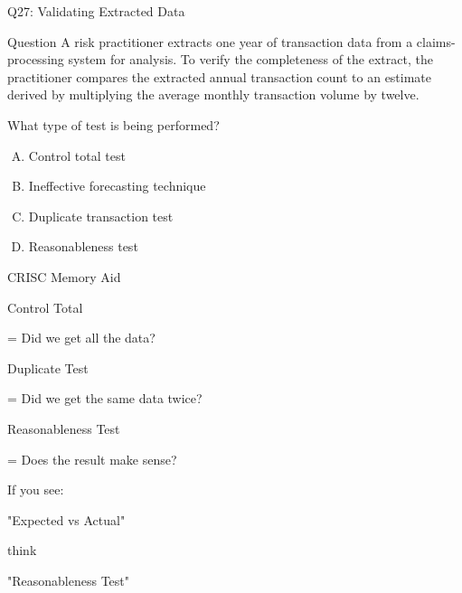 \documentclass{beamer}
\begin{document}
	
	\begin{frame}{Q27: Validating Extracted Data}
		\begin{block}{Question}
			A risk practitioner extracts one year of transaction data from a
			claims-processing system for analysis. To verify the completeness
			of the extract, the practitioner compares the extracted annual
			transaction count to an estimate derived by multiplying the
			average monthly transaction volume by twelve.
			
			What type of test is being performed?
		\end{block}
		
		\begin{enumerate}[(A)]
			\item Control total test
			\item Ineffective forecasting technique
			\item Duplicate transaction test
			\item Reasonableness test
		\end{enumerate}
		
			
		\begin{block}{CRISC Memory Aid}
			
			Control Total
			
			= Did we get all the data?
			
			\vspace{0.1cm}
			
			Duplicate Test
			
			= Did we get the same data twice?
			
			\vspace{0.1cm}
			
			Reasonableness Test
			
			= Does the result make sense?
			
			\vspace{0.15cm}
			
			If you see:
			
			"Expected vs Actual"
			
			think
			
			"Reasonableness Test"
			
		\end{block}
		
	\end{frame}
	
\end{document}
